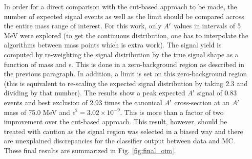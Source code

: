 In order for a direct comparison with the cut-based approach to be made, the number of expected signal events as well as the limit should be compared across the entire mass range of interest. For this work, only $A^\prime$ values in intervals of 5 MeV were explored (to get the continuous distribution, one has to interpolate the algorithms between mass points which is extra work). The signal yield is computed by re-weighting the signal distribution by the true signal shape as a function of mass and $\epsilon$. This is done in a zero-background region as described in the previous paragraph. In addition, a limit is set on this zero-background region (this is equivalent to re-scaling the expected signal distribution by taking 2.3 and dividing by that number). The results show a peak expected $A^\prime$ signal of 0.83 events and best exclusion of 2.93 times the canonical $A^\prime$ cross-section at an $A^\prime$ mass of 75.0 MeV and $\epsilon^2 = 3.02 \times 10^{-9}$. This is more than a factor of two improvement over the cut-based approach. This result, however, should be treated with caution as the signal region was selected in a biased way and there are unexplained discrepancies for the classifier output between data and MC. These final results are summarized in Fig. \ref{fig:final_oim}.

